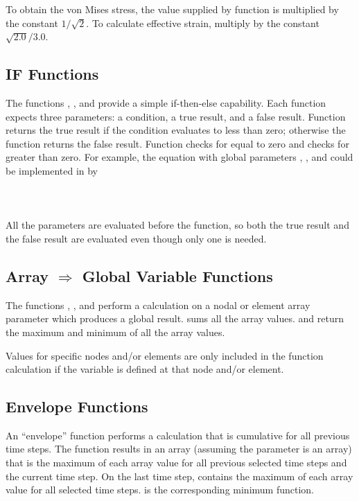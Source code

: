 To obtain the von Mises stress, the value supplied by function
 is multiplied by the constant $1/\sqrt{2}$. To calculate
effective strain, multiply by the constant $\sqrt{2.0}/3.0$.

\subsection*{IF Functions}

The functions , , and  provide a simple
\mbox{if-then-else} capability. Each function expects three parameters:
a condition, a true result, and a false result. Function 
returns the true result if the condition evaluates to less than zero;
otherwise the function returns the false result. Function 
checks for equal to zero and  checks for greater than zero.
For example, the equation
\cenlinesbegin
{}
\cenlinesend
with global parameters , , and 
could be implemented in  by
\cenlinesbegin
{} \\
\hspace*{\myindent}  \\
 \\
\hspace*{\myindent}  \\
\cenlinesend
All the parameters are evaluated before the function, so both the true
result and the false result are evaluated even though only one is
needed.

\subsection*{Array $\Rightarrow$ Global Variable Functions}

The functions , , and  perform a
calculation on a nodal or element array parameter which produces a
global result.  sums all the array values.  and
 return the maximum and minimum of all the array values.

Values for specific nodes and/or elements are only included in the
function calculation if the variable is defined at that node and/or
element.

\subsection*{Envelope Functions}

An ``envelope'' function performs a calculation that is cumulative for
all previous time steps. The function  results in an array
(assuming the parameter is an array) that is the maximum of each array
value for all previous selected time steps and the current time step. On
the last time step,  contains the maximum of each array
value for all selected time steps.  is the corresponding
minimum function.
